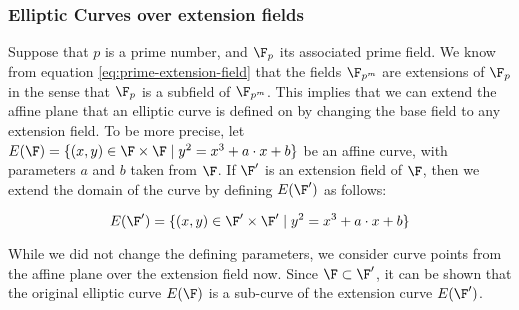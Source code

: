 \subsubsection{Elliptic Curves over extension fields}
\label{sec:curve-extensions}
 Suppose that $p$ is a prime number, and $\F_p$ its associated prime field. We know from equation \eqref{eq:prime-extension-field} that the fields $\F_{p^m}$ are extensions of $\F_p$ in the sense that $\F_{p}$ is a subfield of $\F_{p^m}$. This implies that we can extend the affine plane that an elliptic curve is defined on by changing the base field to any extension field. To be more precise, let 
$E(\F)=\{ (x,y)\in \F \times \F \;|\; y^2 = x^3 +a\cdot x +b \}$ be an affine  curve, with parameters $a$ and $b$ taken from $\F$. If $\F'$ is an extension field of $\F$, then we extend the domain of the curve by defining $E(\F')$ as follows:

\begin{equation}\label{elliptic-curve-extension}
E(\F')=\{ (x,y)\in \F' \times \F' \;|\; y^2 = x^3 +a\cdot x +b \}
\end{equation}   

While we did not change the defining parameters, we consider curve points from the affine plane over the extension field now. Since $\F\subset \F'$, it can be shown that the original elliptic curve $E(\F)$ is a sub-curve of the extension curve $E(\F')$.

